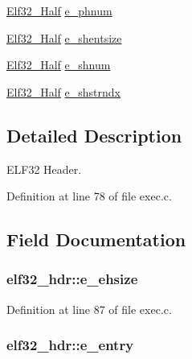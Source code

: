 \begin{DoxyCompactItemize}
\item 
\hyperlink{exec_8c_a2ff0787d7d1bae0f251192806a2974ca}{Elf32\+\_\+\+Half} \hyperlink{structelf32__hdr_ae97c82a1bab1e0bf6de2d4ad0f6eef79}{e\+\_\+phnum}
\item 
\hyperlink{exec_8c_a2ff0787d7d1bae0f251192806a2974ca}{Elf32\+\_\+\+Half} \hyperlink{structelf32__hdr_a8ca2eaada4cff245f41faa852a4a248e}{e\+\_\+shentsize}
\item 
\hyperlink{exec_8c_a2ff0787d7d1bae0f251192806a2974ca}{Elf32\+\_\+\+Half} \hyperlink{structelf32__hdr_ab7d153e79bf2dca73049268f1fcd79c6}{e\+\_\+shnum}
\item 
\hyperlink{exec_8c_a2ff0787d7d1bae0f251192806a2974ca}{Elf32\+\_\+\+Half} \hyperlink{structelf32__hdr_afd7ed18333923147918975fdfa4ee99a}{e\+\_\+shstrndx}
\end{DoxyCompactItemize}


\subsection{Detailed Description}
E\+L\+F32 Header. 

Definition at line 78 of file exec.\+c.



\subsection{Field Documentation}
\hypertarget{structelf32__hdr_a3d3364b74b882c7383f11a17ddda34b2}{
\subsubsection[{e\+\_\+ehsize}]{ elf32\+\_\+hdr\+::e\+\_\+ehsize}}\label{structelf32__hdr_a3d3364b74b882c7383f11a17ddda34b2}


Definition at line 87 of file exec.\+c.

\hypertarget{structelf32__hdr_aebf266c7454956ac9aca091c837f6c14}{
\subsubsection[{e\+\_\+entry}]{ elf32\+\_\+hdr\+::e\+\_\+entry}}\label{structelf32__hdr_aebf266c7454956ac9aca091c837f6c14}


